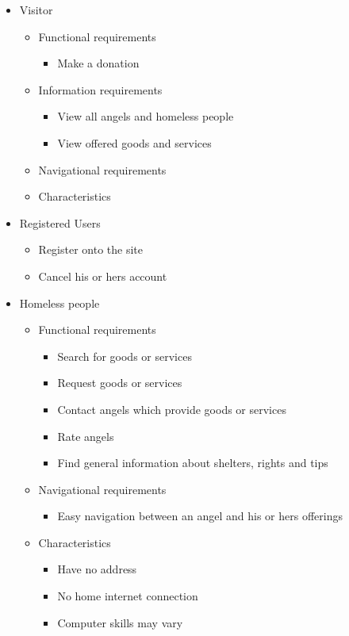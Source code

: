 \documentclass[a4paper]{report}
\begin{document}
\begin{itemize}
\item Visitor

\begin{itemize}
\item Functional requirements
\begin{itemize}
	\item Make a donation
\end{itemize}
\item Information requirements
\begin{itemize}
	\item View all angels and homeless people
	\item View offered goods and services
\end{itemize}
\item Navigational requirements
\item Characteristics
\end{itemize}


\item Registered Users
\begin{itemize}
	\item Register onto the site
	\item Cancel his or hers account
\end{itemize}

\item Homeless people
\begin{itemize}
\item Functional requirements
\begin{itemize}
	\item Search for goods or services
	\item Request goods or services
	\item Contact angels which provide goods or services
	\item Rate angels
	\item Find general information about shelters, rights and tips
\end{itemize}
\item Navigational requirements
\begin{itemize}
	\item Easy navigation between an angel and his or hers offerings
\end{itemize}
\item Characteristics
\begin{itemize}
	\item Have no address
	\item No home internet connection
	\item Computer skills may vary
\end{itemize}
\end{itemize}


\end{itemize}
\end{document}

